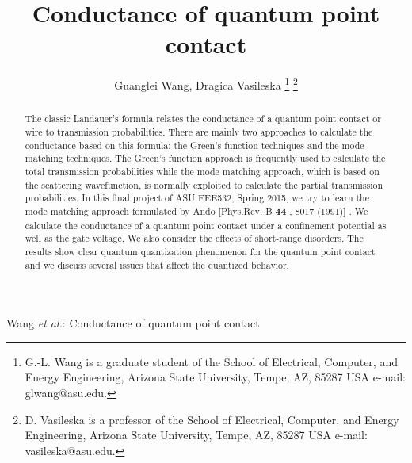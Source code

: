 \documentclass[journal]{IEEEtran}
\begin{document}
%
\title{Conductance of quantum point contact}
%
%
%

\author{{Guanglei Wang,
        Dragica Vasileska
        }%
\thanks{G.-L. Wang is a graduate student of the School of Electrical, Computer, and Energy Engineering, Arizona State
University, Tempe, AZ, 85287 USA e-mail: glwang@asu.edu.}%
\thanks{D. Vasileska is a professor of the School of Electrical, Computer, and Energy Engineering, Arizona State
University, Tempe, AZ, 85287 USA e-mail: vasileska@asu.edu.}%
}

%
{Wang \MakeLowercase{\textit{et al.}}: Conductance of quantum point contact}
\maketitle


\begin{abstract}
    The classic Landauer's formula relates the conductance of a quantum point contact or wire to transmission
    probabilities. There are mainly two approaches to calculate the conductance based on this formula: the Green's
    function techniques and the mode matching techniques. The Green's function approach is frequently used to calculate
    the total transmission probabilities while the mode matching approach, which is based on the scattering
    wavefunction, is normally exploited to calculate the partial transmission probabilities. In this final project of
    ASU EEE532, Spring 2015, we try to learn the mode matching approach formulated by Ando [Phys.Rev. B {\bf 44} , 8017
    (1991)] \cite{A:1991}. We calculate the conductance of a quantum point contact under a confinement potential as well
    as the gate voltage. We also consider the effects of short-range disorders. The results show clear quantum
    quantization phenomenon for the quantum point contact and we discuss several issues that affect the quantized
    behavior.
\end{abstract}
\end{document}
